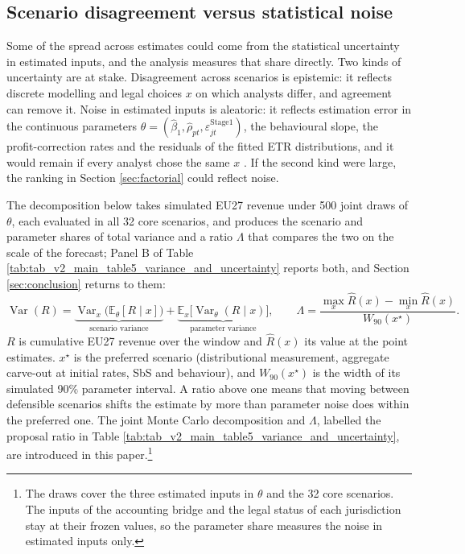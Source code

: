 \documentclass[11pt,a4paper]{article}
\begin{document}
\subsection{Scenario disagreement versus statistical noise}\label{sec:uncertainty}

Some of the spread across estimates could come from the statistical uncertainty in estimated inputs, and the analysis measures that share directly. Two kinds of uncertainty are at stake. Disagreement across scenarios is epistemic: it reflects discrete modelling and legal choices $x$ on which analysts differ, and agreement can remove it. Noise in estimated inputs is aleatoric: it reflects estimation error in the continuous parameters $\theta=(\hat\beta_1,\hat\rho_{pt},\varepsilon^{\mathrm{Stage1}}_{jt})$, the behavioural slope, the profit-correction rates and the residuals of the fitted ETR distributions, and it would remain if every analyst chose the same $x$ \citep{hullermeier2021}. If the second kind were large, the ranking in Section \ref{sec:factorial} could reflect noise.

The decomposition below takes simulated EU27 revenue under 500 joint draws of $\theta$, each evaluated in all 32 core scenarios, and produces the scenario and parameter shares of total variance and a ratio $\Lambda$ that compares the two on the scale of the forecast; Panel B of Table \ref{tab:tab_v2_main_table5_variance_and_uncertainty} reports both, and Section \ref{sec:conclusion} returns to them:
\begin{equation}\label{eq:totalvariance}
\operatorname{Var}(R)=\underbrace{\operatorname{Var}_x\!\bigl(\mathbb{E}_\theta[R\mid x]\bigr)}_{\text{scenario variance}}+\underbrace{\mathbb{E}_x\!\bigl[\operatorname{Var}_\theta(R\mid x)\bigr]}_{\text{parameter variance}},\qquad
\Lambda=\frac{\max_x\hat R(x)-\min_x\hat R(x)}{W_{90}(x^{\star})}.
\end{equation}
$R$ is cumulative EU27 revenue over the window and $\hat R(x)$ its value at the point estimates. $x^{\star}$ is the preferred scenario (distributional measurement, aggregate carve-out at initial rates, SbS and behaviour), and $W_{90}(x^{\star})$ is the width of its simulated 90\% parameter interval. A ratio above one means that moving between defensible scenarios shifts the estimate by more than parameter noise does within the preferred one. The joint Monte Carlo decomposition and $\Lambda$, labelled the proposal ratio in Table \ref{tab:tab_v2_main_table5_variance_and_uncertainty}, are introduced in this paper.\footnote{The draws cover the three estimated inputs in $\theta$ and the 32 core scenarios. The inputs of the accounting bridge and the legal status of each jurisdiction stay at their frozen values, so the parameter share measures the noise in estimated inputs only.}
\end{document}
